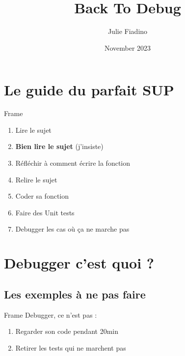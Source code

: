 \documentclass[aspectratio=169]{beamer}
\title{Back To Debug}
\author{Julie Fiadino}
\date{November 2023}
\begin{document}

\maketitle

\section{Le guide du parfait SUP}

\begin{frame}{Frame}

\begin{enumerate}
    \item<1-7> Lire le sujet
    \item<2-7> \textbf<2>{Bien lire le sujet} (j'insiste)
    \item<3-7> Réfléchir à comment écrire la fonction
    \item<4-7> Relire le sujet
    \item<5-7> Coder sa fonction
    \item<6-7> Faire des Unit tests
    \item<7- | alert @8> Debugger les cas où ça ne marche pas
\end{enumerate}
\end{frame}

\section{Debugger c'est quoi ?}

\subsection{Les exemples à ne pas faire}

\begin{frame}{Frame}
    Debugger, ce n'est pas :

    \begin{enumerate}
        \item<2-> Regarder son code pendant 20min
        \item<3-> Retirer les tests qui ne marchent pas
    \end{enumerate}
\end{frame}
\end{document}
